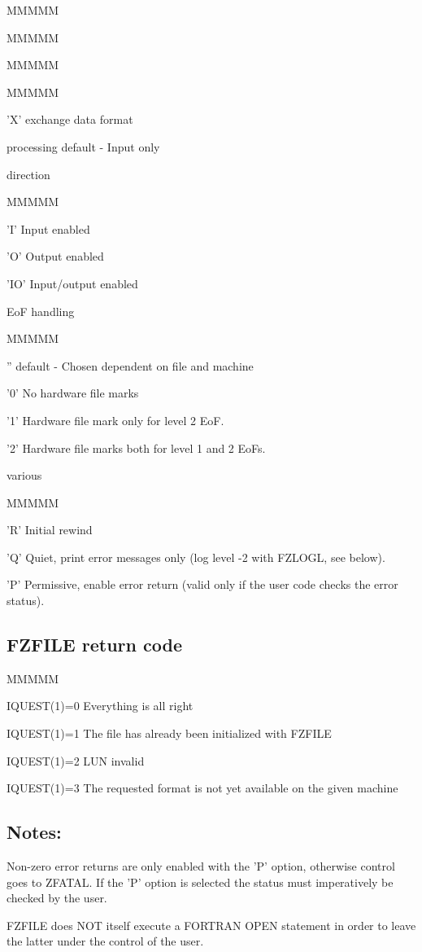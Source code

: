 \begin{DL}{MMMMM}
\begin{DL}{MMMMM}
\begin{DL}{MMMMM}
\begin{DL}{MMMMM}
\item['X'
]exchange data format
\end{DL}
\item[processing
]default - Input only
\item[direction
]
\begin{DL}{MMMMM}
\item['I'
]Input enabled
\item['O'
]Output enabled
\item['IO'
]Input/output enabled
\end{DL}
\item[EoF handling
]
\begin{DL}{MMMMM}
\item[''
]default - Chosen dependent on file and machine
\item['0'
]No hardware file marks
\item['1'
]Hardware file mark only for level 2 EoF.
\item['2'
]Hardware file marks both for level 1 and 2 EoFs.
\end{DL}
\item[various
]
\begin{DL}{MMMMM}
\item['R'
]Initial rewind
\item['Q'
]Quiet, print error messages only
\newline (log level -2 with FZLOGL, see below).
\item['P'
]Permissive, enable error return
\newline (valid only if the user code checks the error status).
\end{DL}
\end{DL}
\end{DL}
\end{DL}
\subsection{FZFILE return code}
\begin{DL}{MMMMM}
\item[IQUEST(1)=0
]Everything is all right
\item[IQUEST(1)=1
]The file has already been initialized with FZFILE
\item[IQUEST(1)=2
]LUN invalid
\item[IQUEST(1)=3
]The requested format is not yet available on the given machine
\end{DL}
\subsection{Notes:}
\par Non-zero error returns are only enabled with the 'P' option,
otherwise control goes to ZFATAL. If the 'P' option is selected
the status must imperatively be checked by the user.
\par FZFILE does NOT itself execute a FORTRAN OPEN statement in
order to leave the latter under the control of the user.
